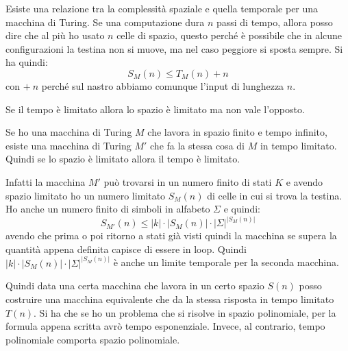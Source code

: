 Esiste una relazione tra la complessità spaziale e quella temporale per una macchina
di Turing. Se una computazione dura $n$ passi di tempo, allora posso dire che al
più ho usato $n$ celle di spazio, questo perché è possibile che in alcune
configurazioni la testina non si muove, ma nel caso peggiore si sposta sempre.
Si ha quindi:
\begin{equation}
    S_M(n) \leq T_M(n) + n
\end{equation}
con $+ \ n$ perché sul nastro abbiamo comunque l'input di lunghezza $n$.
\begin{teorema}
    Se il tempo è limitato allora lo spazio è limitato ma non vale l'opposto.
\end{teorema}
\begin{teorema}
    Se ho una macchina di Turing $M$ che lavora in spazio finito e tempo infinito,
    esiste una macchina di Turing $M'$ che fa la stessa cosa di $M$ in tempo
    limitato. Quindi se lo spazio è limitato allora il tempo è limitato.
\end{teorema}
\begin{dimostrazione}
    Infatti la macchina $M'$ può trovarsi in un numero finito di stati $K$ e
    avendo spazio limitato ho un numero limitato $S_M(n)$ di celle in cui si trova
    la testina. Ho anche un numero finito di simboli in alfabeto $\Sigma$ e quindi:
    \begin{equation}
        S_{M'}(n) \leq |k| \cdot |S_M(n)| \cdot |\Sigma|^{|S_M(n)|}
    \end{equation}
    avendo che prima o poi ritorno a stati già visti quindi la macchina se supera
    la quantità appena definita capisce di essere in loop. Quindi
    $|k| \cdot |S_M(n)| \cdot |\Sigma|^{|S_M(n)|}$ è anche un limite temporale
    per la seconda macchina.
\end{dimostrazione}
Quindi data una certa macchina che lavora in un certo spazio $S(n)$ posso costruire
una macchina equivalente che da la stessa risposta in tempo limitato $T(n)$. Si ha
che se ho un problema che si risolve in spazio polinomiale, per la formula appena
scritta avrò tempo esponenziale. Invece, al contrario, tempo polinomiale comporta
spazio polinomiale.
